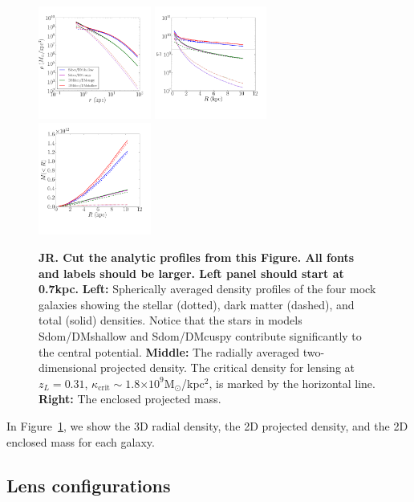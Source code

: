 \documentclass[galley,usenatbib]{mn2e}
\newcommand{\Msun}{\ensuremath{\mathrm{M}_\odot}}
\newcommand{\figref}[1] {Figure~\ref{#1}}
\newcommand{\e}[1]{\ensuremath{\times 10^{#1}}}
\begin{document}
\begin{figure}
\includegraphics[width=0.33\textwidth]{MockGalProfile-a.pdf} 
\includegraphics[width=0.33\textwidth]{MockGalProfile-b.pdf} 
\includegraphics[width=0.33\textwidth]{MockGalProfile-c.pdf}
\caption{{\bf JR. Cut the analytic profiles from this Figure. All fonts and labels should be larger. Left panel should start at 0.7kpc.}
\textbf{Left:} 
Spherically averaged density profiles of the four mock galaxies showing the stellar (dotted), dark matter (dashed),
and total (solid) densities. Notice that the stars in models Sdom/DMshallow and Sdom/DMcuspy contribute significantly to the central potential. 
\textbf{Middle:} 
The radially averaged two-dimensional projected density.
The critical density for lensing at $z_L=0.31$, $\kappa_\mathrm{crit}\sim 1.8\e{9}$\Msun/kpc$^2$, is marked by the horizontal line. 
\textbf{Right:}
The enclosed projected mass.
}
\label{mock galaxies}
\end{figure}

In \figref{mock galaxies}, we show the 3D radial density, 
the 2D projected density, and the 2D enclosed mass for each
galaxy.

\subsection{Lens configurations}\label{sec:lensconfig} %
\end{document}
